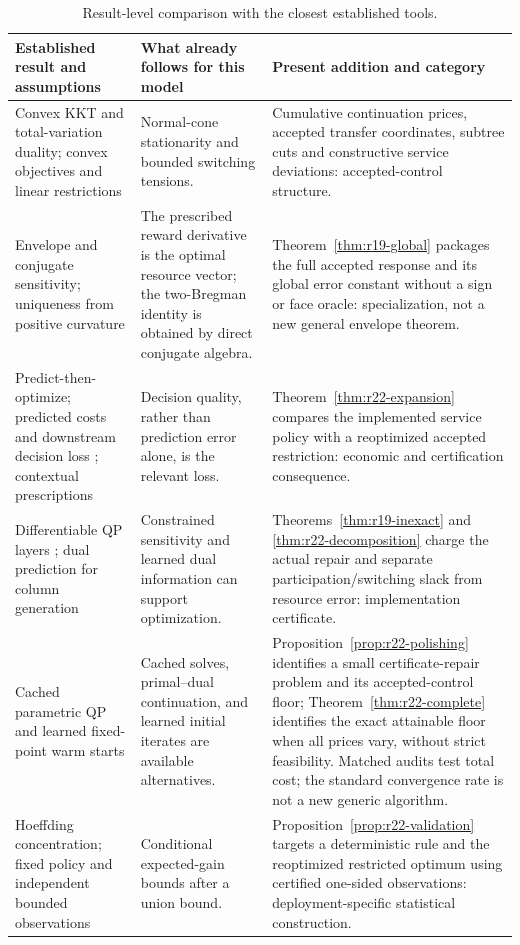 \begin{table}[tbp]\centering\small
\caption{Result-level comparison with the closest established tools.}
\label{tab:r22-novelty}
\begin{tabular}{p{}p{}p{}}
\toprule
Established result and assumptions & What already follows for this model & Present addition and category\\
\midrule
Convex KKT and total-variation duality; convex objectives and linear restrictions \citep{BoydVandenberghe2004,TibshiraniTaylor2011}
& Normal-cone stationarity and bounded switching tensions.
& Cumulative continuation prices, accepted transfer coordinates, subtree cuts and constructive service deviations: accepted-control structure.\\
Envelope and conjugate sensitivity; uniqueness from positive curvature \citep{BoydVandenberghe2004}
& The prescribed reward derivative is the optimal resource vector; the two-Bregman identity is obtained by direct conjugate algebra.
& Theorem~\ref{thm:r19-global} packages the full accepted response and its global error constant without a sign or face oracle: specialization, not a new general envelope theorem.\\
Predict-then-optimize; predicted costs and downstream decision loss \citep{ElmachtoubGrigas2022}; contextual prescriptions \citep{BertsimasKallus2020}
& Decision quality, rather than prediction error alone, is the relevant loss.
& Theorem~\ref{thm:r22-expansion} compares the implemented service policy with a reoptimized accepted restriction: economic and certification consequence.\\
Differentiable QP layers \citep{AmosKolter2017}; dual prediction for column generation \citep{KraulSeizingerBrunner2023}
& Constrained sensitivity and learned dual information can support optimization.
& Theorems~\ref{thm:r19-inexact} and \ref{thm:r22-decomposition} charge the actual repair and separate participation/switching slack from resource error: implementation certificate.\\
Cached parametric QP and learned fixed-point warm starts \citep{Stellato2020,Sambharya2024}
& Cached solves, primal--dual continuation, and learned initial iterates are available alternatives.
& Proposition~\ref{prop:r22-polishing} identifies a small certificate-repair problem and its accepted-control floor; Theorem~\ref{thm:r22-complete} identifies the exact attainable floor when all prices vary, without strict feasibility. Matched audits test total cost; the standard convergence rate is not a new generic algorithm.\\
Hoeffding concentration; fixed policy and independent bounded observations \citep{Hoeffding1963}
& Conditional expected-gain bounds after a union bound.
& Proposition~\ref{prop:r22-validation} targets a deterministic rule and the reoptimized restricted optimum using certified one-sided observations: deployment-specific statistical construction.\\
\bottomrule
\end{tabular}
\end{table}
